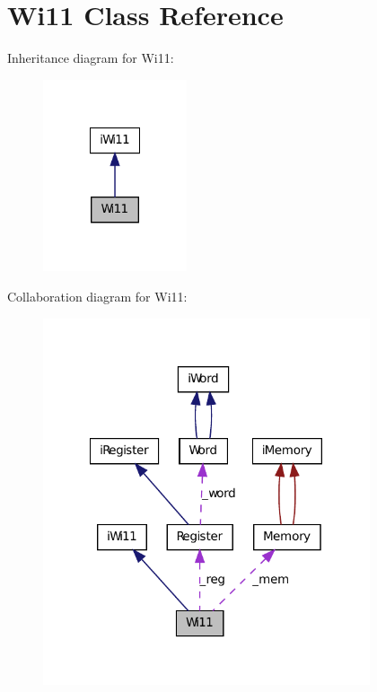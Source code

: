 \hypertarget{classWi11}{
\section{Wi11 Class Reference}
\label{classWi11}
}


Inheritance diagram for Wi11:\nopagebreak
\begin{figure}[H]
\begin{center}
\leavevmode
\includegraphics[width=120pt]{classWi11__inherit__graph}
\end{center}
\end{figure}


Collaboration diagram for Wi11:
\nopagebreak
\begin{figure}[H]
\begin{center}
\leavevmode
\includegraphics[width=273pt]{classWi11__coll__graph}
\end{center}
\end{figure}
